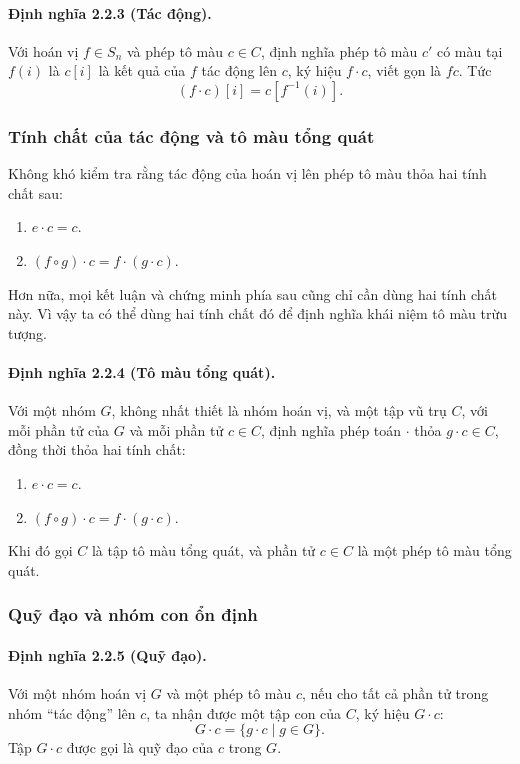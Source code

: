 \documentclass[11pt]{article}
\begin{document}
\paragraph{Định nghĩa 2.2.3 (Tác động).}
Với hoán vị \(f\in S_n\) và phép tô màu \(c\in C\), định nghĩa phép tô màu
\(c'\) có màu tại \(f(i)\) là \(c[i]\) là kết quả của \(f\) tác động lên \(c\),
ký hiệu \(f\cdot c\), viết gọn là \(fc\). Tức
\[
  (f\cdot c)[i]=c[f^{-1}(i)].
\]

\subsubsection{Tính chất của tác động và tô màu tổng quát}

Không khó kiểm tra rằng tác động của hoán vị lên phép tô màu thỏa hai tính chất
sau:
\begin{enumerate}
  \item \(e\cdot c=c\).
  \item \((f\circ g)\cdot c=f\cdot(g\cdot c)\).
\end{enumerate}

Hơn nữa, mọi kết luận và chứng minh phía sau cũng chỉ cần dùng hai tính chất
này. Vì vậy ta có thể dùng hai tính chất đó để định nghĩa khái niệm tô màu
trừu tượng.

\paragraph{Định nghĩa 2.2.4 (Tô màu tổng quát).}
Với một nhóm \(G\), không nhất thiết là nhóm hoán vị, và một tập vũ trụ \(C\),
với mỗi phần tử của \(G\) và mỗi phần tử \(c\in C\), định nghĩa phép toán
\(\cdot\) thỏa \(g\cdot c\in C\), đồng thời thỏa hai tính chất:
\begin{enumerate}
  \item \(e\cdot c=c\).
  \item \((f\circ g)\cdot c=f\cdot(g\cdot c)\).
\end{enumerate}
Khi đó gọi \(C\) là tập tô màu tổng quát, và phần tử \(c\in C\) là một phép tô
màu tổng quát.

\subsubsection{Quỹ đạo và nhóm con ổn định}

\paragraph{Định nghĩa 2.2.5 (Quỹ đạo).}
Với một nhóm hoán vị \(G\) và một phép tô màu \(c\), nếu cho tất cả phần tử
trong nhóm ``tác động'' lên \(c\), ta nhận được một tập con của \(C\), ký hiệu
\(G\cdot c\):
\[
  G\cdot c=\{g\cdot c\mid g\in G\}.
\]
Tập \(G\cdot c\) được gọi là quỹ đạo của \(c\) trong \(G\).
\end{document}
